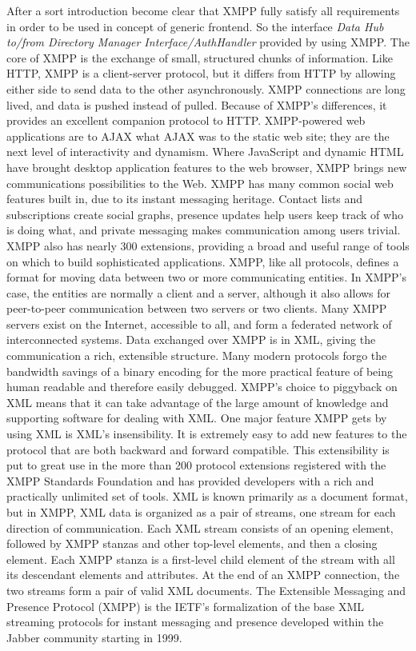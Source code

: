       After a sort introduction become clear that XMPP fully satisfy all requirements in order to be used in concept of generic frontend. So the interface \emph{Data Hub to/from Directory Manager Interface/AuthHandler} provided by using XMPP.
      \newline
      The core of XMPP is the exchange of small, structured chunks of information. Like HTTP, XMPP is a client-server protocol, but it differs from HTTP by allowing either side to send data to the other asynchronously. XMPP connections are long lived, and data is pushed instead of pulled. Because of XMPP’s differences, it provides an excellent companion protocol to HTTP. XMPP-powered web applications are to AJAX what AJAX was to the static web site; they are the next level of interactivity and dynamism. Where JavaScript and dynamic HTML have brought desktop application features to the web browser, XMPP brings new communications possibilities to the Web. XMPP has many common social web features built in, due to its instant messaging heritage. Contact lists and subscriptions create social graphs, presence updates help users keep track of who is doing what, and private messaging makes communication among users trivial. XMPP also has nearly 300 extensions, providing a broad and useful range of tools on which to build sophisticated applications. 
      \newline
      XMPP, like all protocols, defines a format for moving data between two or more communicating entities. In XMPP’s case, the entities are normally a client and a server, although it also allows for peer-to-peer communication between two servers or two clients. Many XMPP servers exist on the Internet, accessible to all, and form a federated network of interconnected systems. Data exchanged over XMPP is in XML, giving the communication a rich, extensible structure. Many modern protocols forgo the bandwidth savings of a binary encoding for the more practical feature of being human readable and therefore easily debugged. XMPP’s choice to piggyback on XML means that it can take advantage of the large amount of knowledge and supporting software for dealing with XML. One major feature XMPP gets by using XML is XML’s insensibility. It is extremely easy to add new features to the protocol that are both backward and forward compatible. This extensibility is put to great use in the more than 200 protocol extensions registered with the XMPP Standards Foundation and has provided developers with a rich and practically unlimited set of tools. XML is known primarily as a document format, but in XMPP, XML data is organized as a pair of streams, one stream for each direction of communication. Each XML stream consists of an opening element, followed by XMPP stanzas and other top-level elements, and then a closing element. Each XMPP stanza is a first-level child element of the stream with all its descendant elements and attributes. At the end of an XMPP connection, the two streams form a pair of valid XML documents.
      The Extensible Messaging and Presence Protocol (XMPP) is the IETF’s formalization of the base XML streaming protocols for instant messaging and presence developed within the Jabber community starting in 1999\cite{xmpp}.

